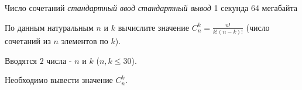 \begin{problem}%
{Число сочетаний}%
{\textsl{стандартный ввод}}%
{\textsl{стандартный вывод}}%
{1 секунда}%
{64 мегабайта}{}

По данным натуральным $n$ и $k$ вычислите значение $C_n^k=\frac{n!}{k!(n-k)!}$ (число сочетаний из $n$ элементов по $k$).

\InputFile

Вводятся $2$ числа - $n$ и $k$ ($n, k \le 30$).

\OutputFile

Необходимо вывести  значение $C_n^k$.

\Examples

\begin{example}
%
\end{example}
\end{problem}